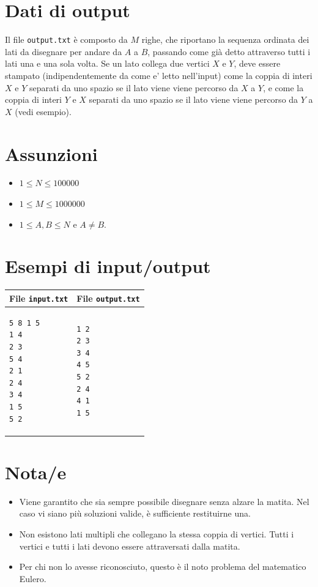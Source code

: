 \documentclass[a4paper,11pt]{article}
\begin{document}
\section*{Dati di output}

Il file \texttt{output.txt} è composto da $M$
righe, 
che riportano la sequenza ordinata dei lati da disegnare per andare
da $A$ a $B$, passando come già detto attraverso tutti i lati una e una sola volta.
Se un lato collega due vertici $X$ e $Y$, deve
essere stampato (indipendentemente da come e' letto nell'input) come
la coppia di interi $X$ e $Y$ separati da uno spazio
se il lato viene viene percorso da $X$ a $Y$, e come
la coppia di interi $Y$ e $X$ separati da uno spazio
se il lato viene viene percorso da $Y$ a $X$ (vedi esempio).

\section*{Assunzioni}

\begin{itemize}
  \item $1 ≤ N ≤ 100000$
  \item $1 ≤ M ≤ 1000000$
  \item $1 ≤ A, B ≤ N$ e $A ≠ B$.
\end{itemize}

\section*{Esempi di input/output}
    \noindent
    \begin{tabular}{p{11cm}|p{5cm}}
    \toprule
    \textbf{File \texttt{input.txt}}
    & \textbf{File \texttt{output.txt}}
    \\
    \midrule
    \scriptsize
    \begin{verbatim}
5 8 1 5
1 4
2 3
5 4
2 1
2 4
3 4
1 5
5 2
\end{verbatim}
    &
    \scriptsize
    \begin{verbatim}
1 2
2 3
3 4
4 5
5 2
2 4
4 1
1 5
\end{verbatim}
    \\
    \bottomrule
    \end{tabular}


\section*{Nota/e}

\begin{itemize}
  \item Viene garantito che sia sempre possibile disegnare senza alzare la matita. Nel caso vi siano più soluzioni valide, è sufficiente restituirne una.
  \item Non esistono lati multipli che collegano la stessa coppia di vertici. Tutti i vertici e tutti i lati devono essere attraversati dalla matita.
  \item Per chi non lo avesse riconosciuto, questo è il noto problema del matematico Eulero.
\end{itemize}
\end{document}
